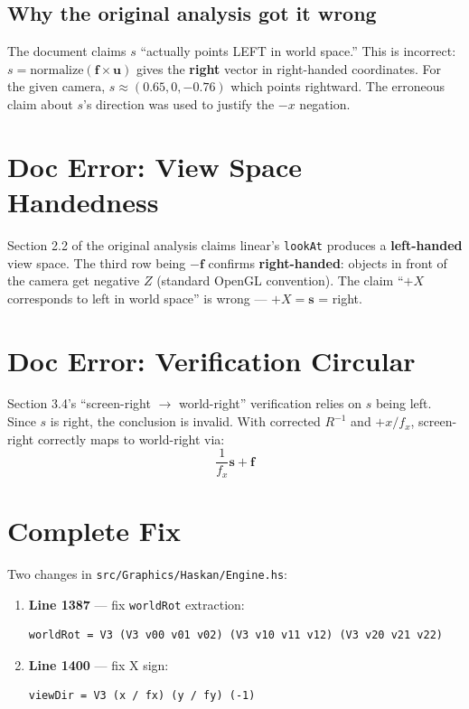 \documentclass{article}
\begin{document}
\subsection{Why the original analysis got it wrong}

The document claims $s$ ``actually points LEFT in world space.'' This is
incorrect: $s = \text{normalize}(\mathbf{f} \times \mathbf{u})$ gives the
\textbf{right} vector in right-handed coordinates. For the given camera,
$s \approx (0.65, 0, -0.76)$ which points rightward. The erroneous claim
about $s$'s direction was used to justify the $-x$ negation.

\section{Doc Error: View Space Handedness}

Section 2.2 of the original analysis claims linear's \texttt{lookAt} produces
a \textbf{left-handed} view space. The third row being $-\mathbf{f}$ confirms
\textbf{right-handed}: objects in front of the camera get negative $Z$
(standard OpenGL convention). The claim ``$+X$ corresponds to left in world
space'' is wrong --- $+X = \mathbf{s}$ = right.

\section{Doc Error: Verification Circular}

Section 3.4's ``screen-right $\to$ world-right'' verification relies on $s$
being left. Since $s$ is right, the conclusion is invalid. With corrected
$R^{-1}$ and $+x/f_x$, screen-right correctly maps to world-right via:
\[
\frac{1}{f_x}\mathbf{s} + \mathbf{f}
\]

\section{Complete Fix}

Two changes in \texttt{src/Graphics/Haskan/Engine.hs}:

\begin{enumerate}
\item \textbf{Line 1387} --- fix \texttt{worldRot} extraction:
\begin{verbatim}
worldRot = V3 (V3 v00 v01 v02) (V3 v10 v11 v12) (V3 v20 v21 v22)
\end{verbatim}

\item \textbf{Line 1400} --- fix X sign:
\begin{verbatim}
viewDir = V3 (x / fx) (y / fy) (-1)
\end{verbatim}
\end{enumerate}
\end{document}
